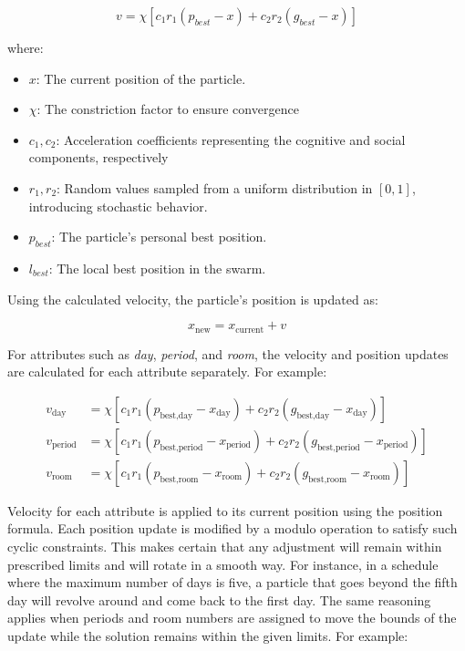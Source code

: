 \[
v = \chi \left[ c_1 r_1 (p_{best} - x) + c_2 r_2 (g_{best} - x) \right]
\]

where:
\begin{itemize}
    \item \(x\): The current position of the particle.
    \item \(\chi\): The constriction factor to ensure convergence 
    \item \(c_1, c_2\): Acceleration coefficients representing the cognitive and social components, respectively 
    \item \(r_1, r_2\): Random values sampled from a uniform distribution in \([0, 1]\), introducing stochastic behavior.
    \item \(p_{best}\): The particle's personal best position.
    \item \(l_{best}\): The local best position in the swarm.
\end{itemize}

Using the calculated velocity, the particle's position is updated as:

\[
x_{\text{new}} = x_{\text{current}} + v
\]

For attributes such as \textit{day}, \textit{period}, and \textit{room}, the velocity and position updates are calculated for each attribute separately. \cite{Chen2013-cp} For example:

\begin{align*}
    v_{\text{day}} &= \chi \left[ c_1 r_1 (p_{\text{best,day}} - x_{\text{day}}) + c_2 r_2 (g_{\text{best,day}} - x_{\text{day}}) \right] \\
    v_{\text{period}} &= \chi \left[ c_1 r_1 (p_{\text{best,period}} - x_{\text{period}}) + c_2 r_2 (g_{\text{best,period}} - x_{\text{period}}) \right] \\
    v_{\text{room}} &= \chi \left[ c_1 r_1 (p_{\text{best,room}} - x_{\text{room}}) + c_2 r_2 (g_{\text{best,room}} - x_{\text{room}}) \right]
\end{align*}

Velocity for each attribute is applied to its current position using the position formula. Each position update is modified by a modulo operation to satisfy such cyclic constraints. This makes certain that any adjustment will remain within prescribed limits and will rotate in a smooth way. For instance, in a schedule where the maximum number of days is five, a particle that goes beyond the fifth day will revolve around and come back to the first day. The same reasoning applies when periods and room numbers are assigned to move the bounds of the update while the solution remains within the given limits. For example:

